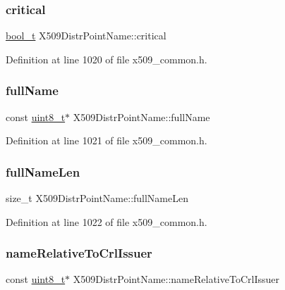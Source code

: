 \subsubsection{\texorpdfstring{critical}{critical}}
{\footnotesize\ttfamily \hyperlink{compiler__port_8h_a812d16e5494522586b3784e55d479912}{bool\+\_\+t} X509\+Distr\+Point\+Name\+::critical}



Definition at line 1020 of file x509\+\_\+common.\+h.

\mbox{\label{structX509DistrPointName_a896bf61f4876e588066efc3ed6662af3}} 
\subsubsection{\texorpdfstring{full\+Name}{fullName}}
{\footnotesize\ttfamily const \hyperlink{stdint_8h_aba7bc1797add20fe3efdf37ced1182c5}{uint8\+\_\+t}$\ast$ X509\+Distr\+Point\+Name\+::full\+Name}



Definition at line 1021 of file x509\+\_\+common.\+h.

\mbox{\label{structX509DistrPointName_a5ec1c1e9b5d6ffbe8441ef704a19cf4a}} 
\subsubsection{\texorpdfstring{full\+Name\+Len}{fullNameLen}}
{\footnotesize\ttfamily size\+\_\+t X509\+Distr\+Point\+Name\+::full\+Name\+Len}



Definition at line 1022 of file x509\+\_\+common.\+h.

\mbox{\label{structX509DistrPointName_a489b4ab402a74d61fa69793850475e4d}} 
\subsubsection{\texorpdfstring{name\+Relative\+To\+Crl\+Issuer}{nameRelativeToCrlIssuer}}
{\footnotesize\ttfamily const \hyperlink{stdint_8h_aba7bc1797add20fe3efdf37ced1182c5}{uint8\+\_\+t}$\ast$ X509\+Distr\+Point\+Name\+::name\+Relative\+To\+Crl\+Issuer}



